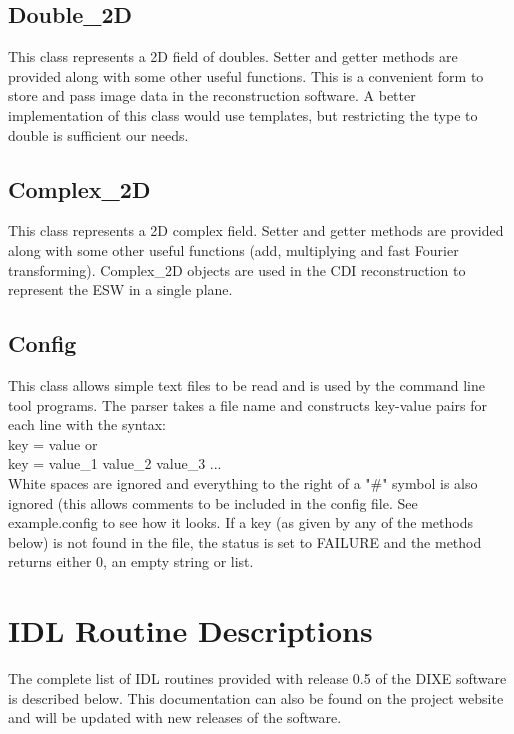 \documentclass[]{nadia}
\begin{document}
\subsection{Double\_2D}
This class represents a 2D field of doubles. Setter and getter methods
are provided along with some other useful functions. This is a
convenient form to store and pass image data in the reconstruction
software. A better implementation of this class would use templates,
but restricting the type to double is sufficient our needs.

\subsection{Complex\_2D}
This class represents a 2D complex field. Setter and getter methods
are provided along with some other useful functions (add, multiplying
and fast Fourier transforming). Complex\_2D objects are used in the CDI
reconstruction to represent the ESW in a single plane.

\subsection{Config}
This class allows simple text files to be read and is used by the
command line tool programs. The parser takes a file name and
constructs key-value pairs for each line with the syntax:\\ 
key = value or \\
key = value\_1 value\_2 value\_3 ... \\
White spaces are ignored and everything to the right of a "\#" symbol
is also ignored (this allows comments to be included in the config
file. See example.config to see how it looks. If a key (as given by
any of the methods below) is not found in the file, the status is set
to FAILURE and the method returns either 0, an empty string or list.


\section{IDL Routine Descriptions}
\label{sec:idl_routines}
The complete list of IDL routines provided with release 0.5 of the
DIXE software is described below. This documentation can also be found
on the project website and will be updated with new releases of the
software.



\end{document}
